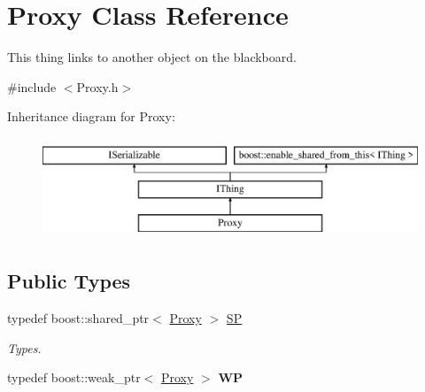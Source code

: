\hypertarget{class_proxy}{}\section{Proxy Class Reference}
\label{class_proxy}


This thing links to another object on the blackboard.  




{\ttfamily \#include $<$Proxy.\+h$>$}

Inheritance diagram for Proxy\+:\begin{figure}[H]
\begin{center}
\leavevmode
\includegraphics[height=3.000000cm]{class_proxy}
\end{center}
\end{figure}
\subsection*{Public Types}
\begin{DoxyCompactItemize}
\item 
\mbox{\label{class_proxy_a9e49424f92534e11863eec6067759c33}} 
typedef boost\+::shared\+\_\+ptr$<$ \hyperlink{class_proxy}{Proxy} $>$ \hyperlink{class_proxy_a9e49424f92534e11863eec6067759c33}{SP}
\begin{DoxyCompactList}\small\item\em Types. \end{DoxyCompactList}\item 
\mbox{\label{class_proxy_ac521fb293e7ef97c5653f7fc8db6e038}} 
typedef boost\+::weak\+\_\+ptr$<$ \hyperlink{class_proxy}{Proxy} $>$ {\bfseries WP}
\end{DoxyCompactItemize}
